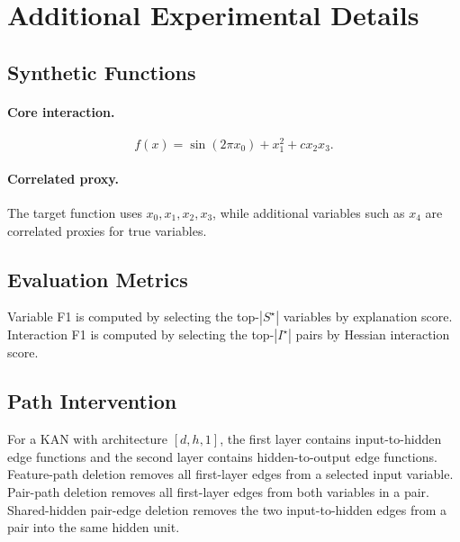 \documentclass[11pt]{article}
\begin{document}



\appendix

\section{Additional Experimental Details}

\subsection{Synthetic Functions}

\paragraph{Core interaction.}
\[
    f(x)=\sin(2\pi x_0)+x_1^2+c x_2x_3.
\]

\paragraph{Correlated proxy.}
The target function uses $x_0,x_1,x_2,x_3$, while additional variables such as $x_4$ are correlated proxies for true variables.

\subsection{Evaluation Metrics}

Variable F1 is computed by selecting the top-$|S^\star|$ variables by explanation score.
Interaction F1 is computed by selecting the top-$|I^\star|$ pairs by Hessian interaction score.

\subsection{Path Intervention}

For a KAN with architecture $[d,h,1]$, the first layer contains input-to-hidden edge functions and the second layer contains hidden-to-output edge functions.
Feature-path deletion removes all first-layer edges from a selected input variable.
Pair-path deletion removes all first-layer edges from both variables in a pair.
Shared-hidden pair-edge deletion removes the two input-to-hidden edges from a pair into the same hidden unit.
\end{document}
